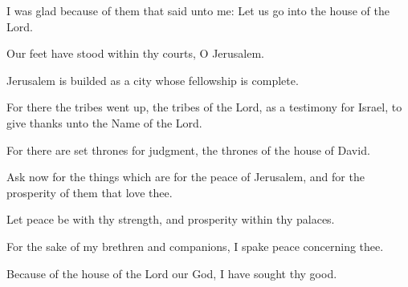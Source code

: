 I was glad because of them that said unto me: Let us go into the house of the Lord.

Our feet have stood within thy courts, O Jerusalem.

Jerusalem is builded as a city whose fellowship is complete.

For there the tribes went up, the tribes of the Lord, as a testimony for Israel, to give thanks unto the Name of the Lord.

For there are set thrones for judgment, the thrones of the house of David.

Ask now for the things which are for the peace of Jerusalem, and for the prosperity of them that love thee.

Let peace be with thy strength, and prosperity within thy palaces.

For the sake of my brethren and companions, I spake peace concerning thee.

Because of the house of the Lord our God, I have sought thy good.
